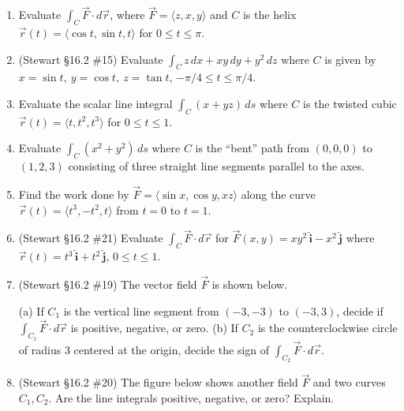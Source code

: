 \documentclass[12pt]{article}
\newcommand{\ihat}{\hat{\textbf{i}}}
\newcommand{\jhat}{\hat{\textbf{j}}}
\begin{document}
\begin{enumerate}
\begin{enumerate}
        \item Evaluate $\int_{C} \vec{F} \cdot d\vec{r}$, where $\vec{F} = \langle z, x, y \rangle$ and $C$ is the helix $\vec{r}(t) = \langle \cos t, \sin t, t \rangle$ for $0 \leq t \leq \pi$.
        \item (Stewart \S16.2 \#15) Evaluate $\int_C z\,dx + xy\,dy + y^2\,dz$ where $C$ is given by $x = \sin t,\ y = \cos t,\ z = \tan t$, $-\pi/4 \leq t \leq \pi/4$.
        \item Evaluate the scalar line integral $\displaystyle\int_C (x + yz) \, ds$ where $C$ is the twisted cubic $\vec{r}(t) = \langle t, t^2, t^3 \rangle$ for $0 \leq t \leq 1$.
        \item  Evaluate $\int_C (x^2 + y^2) \, ds$ where $C$ is the ``bent'' path from $(0,0,0)$ to $(1,2,3)$ consisting of three straight line segments parallel to the axes.
        \item Find the work done by $\vec{F} = \langle \sin x, \cos y, xz \rangle$ along the curve $\vec{r}(t) = \langle t^3, -t^2, t \rangle$ from $t=0$ to $t=1$.
        \item (Stewart \S16.2 \#21) Evaluate $\int_C \vec F\cdot d\vec r$ for $\vec F(x,y) = xy^2\,\ihat - x^2\,\jhat$ where $\vec r(t) = t^3\,\ihat + t^2\,\jhat$, $0\leq t \leq 1$.
        \item (Stewart \S16.2 \#19) The vector field $\vec F$ is shown below.
        \begin{center}
        \end{center}
        (a) If $C_1$ is the vertical line segment from $(-3,-3)$ to $(-3,3)$, decide if $\int_{C_1}\vec F\cdot d\vec r$ is positive, negative, or zero.
        (b) If $C_2$ is the counterclockwise circle of radius $3$ centered at the origin, decide the sign of $\int_{C_2}\vec F\cdot d\vec r$.
        \item (Stewart \S16.2 \#20) The figure below shows another field $\vec F$ and two curves $C_1, C_2$. Are the line integrals positive, negative, or zero? Explain.

\end{enumerate}
\end{enumerate}
\end{document}
